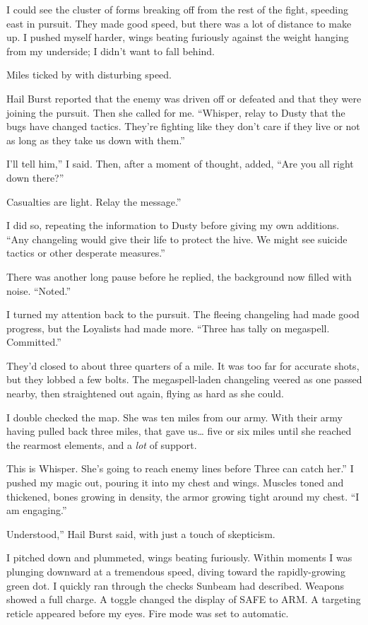 I could see the cluster of forms breaking off from the rest of the fight, speeding east in pursuit. They made good speed, but there was a lot of distance to make up. I pushed myself harder, wings beating furiously against the weight hanging from my underside; I didn’t want to fall behind.

Miles ticked by with disturbing speed.

Hail Burst reported that the enemy was driven off or defeated and that they were joining the pursuit. Then she called for me. “Whisper, relay to Dusty that the bugs have changed tactics. They’re fighting like they don’t care if they live or not as long as they take us down with them.”

\leavevmode{}I’ll tell him,” I said. Then, after a moment of thought, added, “Are you all right down there?”

\leavevmode{}Casualties are light. Relay the message.”

I did so, repeating the information to Dusty before giving my own additions. “Any changeling would give their life to protect the hive. We might see suicide tactics or other desperate measures.”

There was another long pause before he replied, the background now filled with noise. “Noted.”

I turned my attention back to the pursuit. The fleeing changeling had made good progress, but the Loyalists had made more. “Three has tally on megaspell. Committed.”

They’d closed to about three quarters of a mile. It was too far for accurate shots, but they lobbed a few bolts. The megaspell-laden changeling veered as one passed nearby, then straightened out again, flying as hard as she could.

I double checked the map. She was ten miles from our army. With their army having pulled back three miles, that gave us… five or six miles until she reached the rearmost elements, and a \textit{lot} of support.

\leavevmode{}This is Whisper. She’s going to reach enemy lines before Three can catch her.” I pushed my magic out, pouring it into my chest and wings. Muscles toned and thickened, bones growing in density, the armor growing tight around my chest. “I am engaging.”

\leavevmode{}Understood,” Hail Burst said, with just a touch of skepticism.

I pitched down and plummeted, wings beating furiously. Within moments I was plunging downward at a tremendous speed, diving toward the rapidly-growing green dot. I quickly ran through the checks Sunbeam had described. Weapons showed a full charge. A toggle changed the display of SAFE to ARM. A targeting reticle appeared before my eyes. Fire mode was set to automatic.

